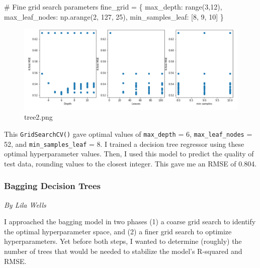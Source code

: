 \documentclass[
  letterpaper,
  DIV=11,
  numbers=noendperiod]{scrartcl}
\newenvironment{Shaded}{\begin{snugshade}}{\end{snugshade}}
\newcommand{\BuiltInTok}[1]{\textcolor[rgb]{0.00,0.23,0.31}{#1}}
\newcommand{\CommentTok}[1]{\textcolor[rgb]{0.37,0.37,0.37}{#1}}
\newcommand{\DecValTok}[1]{\textcolor[rgb]{0.68,0.00,0.00}{#1}}
\newcommand{\NormalTok}[1]{\textcolor[rgb]{0.00,0.23,0.31}{#1}}
\newcommand{\OperatorTok}[1]{\textcolor[rgb]{0.37,0.37,0.37}{#1}}
\newcommand{\StringTok}[1]{\textcolor[rgb]{0.13,0.47,0.30}{#1}}
\begin{document}
\begin{Shaded}
\begin{Highlighting}[]
\CommentTok{\# Fine grid search parameters}
\NormalTok{fine\_grid }\OperatorTok{=}\NormalTok{ \{    }
    \StringTok{\textquotesingle{}max\_depth\textquotesingle{}}\NormalTok{: }\BuiltInTok{range}\NormalTok{(}\DecValTok{3}\NormalTok{,}\DecValTok{12}\NormalTok{),}
    \StringTok{\textquotesingle{}max\_leaf\_nodes\textquotesingle{}}\NormalTok{: np.arange(}\DecValTok{2}\NormalTok{, }\DecValTok{127}\NormalTok{, }\DecValTok{25}\NormalTok{),}
    \StringTok{\textquotesingle{}min\_samples\_leaf\textquotesingle{}}\NormalTok{: [}\DecValTok{8}\NormalTok{, }\DecValTok{9}\NormalTok{, }\DecValTok{10}\NormalTok{]}
\NormalTok{\}}
\end{Highlighting}
\end{Shaded}

\begin{figure}

{\centering \includegraphics{Project_Report_Saturn_files/figure-pdf/tree2.png}

}

\caption{tree2.png}

\end{figure}

This \texttt{GridSearchCV()} gave optimal values of \texttt{max\_depth}
= 6, \texttt{max\_leaf\_nodes} = 52, and \texttt{min\_samples\_leaf} =
8. I trained a decision tree regressor using these optimal
hyperparameter values. Then, I used this model to predict the quality of
test data, rounding values to the closest integer. This gave me an RMSE
of 0.804.

\hypertarget{bagging-decision-trees}{%
\subsubsection{Bagging Decision Trees}\label{bagging-decision-trees}}

\emph{By Lila Wells}

I approached the bagging model in two phases (1) a coarse grid search to
identify the optimal hyperparameter space, and (2) a finer grid search
to optimize hyperparameters. Yet before both steps, I wanted to
determine (roughly) the number of trees that would be needed to
stabilize the model's R-squared and RMSE.
\end{document}
